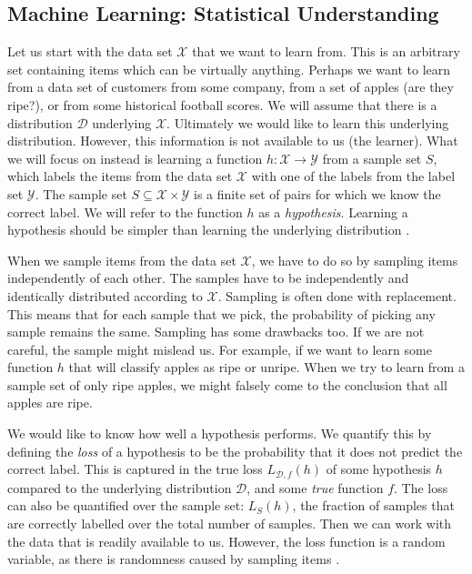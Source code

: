 \documentclass[../main.tex]{subfiles}
\begin{document}
\subsection{Machine Learning: Statistical Understanding}
\label{sec:I_machine_learning}

Let us start with the data set $\mathcal{X}$ that we want to learn from.
This is an arbitrary set containing items which can be virtually anything.
Perhaps we want to learn from a data set of customers from some company, from a set of apples (are they ripe?), or from some historical football scores.
We will assume that there is a distribution $\mathcal{D}$ underlying $\mathcal{X}$.
Ultimately we would like to learn this underlying distribution.
However, this information is not available to us (the learner).
What we will focus on instead is learning a function $h: \mathcal{X} \to \mathcal{Y} $ from a sample set $S$,
which labels the items from the data set $\mathcal{X}$ with one of the labels from the label set $\mathcal{Y}$.
The sample set $S \subseteq \mathcal{X} \times \mathcal{Y}$ is a finite set of pairs for which we know the correct label.
We will refer to the function $h$ as a \emph{hypothesis}.
Learning a hypothesis should be simpler than learning the underlying distribution
\cite[Chapter~2]{Shalev2014understanding}.


When we sample items from the data set $\mathcal{X}$, we have to do so by sampling items independently of each other.
The samples have to be independently and identically distributed according to $\mathcal{X}$.
Sampling is often done with replacement.
This means that for each sample that we pick, the probability of picking any sample remains the same.
Sampling has some drawbacks too.
If we are not careful, the sample might mislead us.
For example, if we want to learn some function $h$ that will classify apples as ripe or unripe.
When we try to learn from a sample set of only ripe apples, we might falsely come to the conclusion that all apples are ripe.
 
 
We would like to know how well a hypothesis performs.
We quantify this by defining the \emph{loss} of a hypothesis to be the probability that it does not predict the correct label.
This is captured in the true loss $L_{\mathcal{D}, f}(h)$
of some hypothesis $h$ compared to the underlying distribution $\mathcal{D}$, and some \emph{true} function $f$.
The loss can also be quantified over the sample set: $L_S(h)$, the fraction of samples that are correctly labelled over the total number of samples.
Then we can work with the data that is readily available to us.
However, the loss function is a random variable, as there is randomness caused by sampling items
\cite[Chapter~2]{Shalev2014understanding}.
\end{document}
